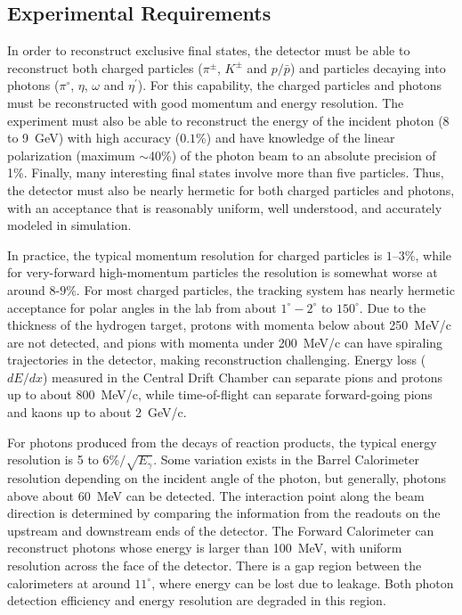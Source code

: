 \subsection[Experimental Requirements]{Experimental Requirements \label{sec:intro:requirements}}
In order to reconstruct exclusive final states, the \gx{} detector must be able to reconstruct both charged particles ($\pi^{\pm}$, $K^{\pm}$ and $p/\bar{p}$) and particles decaying into photons ($\pi^{\circ}$, $\eta$, $\omega$ and $\eta^{\prime}$). For this capability, the charged particles and photons must be reconstructed with good momentum and energy resolution. The experiment must also be able to reconstruct the energy of the incident photon (8 to 9~GeV) with high accuracy ($0.1$\%) and have knowledge of the linear polarization (maximum $\sim$40\%) of the photon beam to an absolute precision of 1\%. Finally, many interesting final states involve more than five particles. Thus, the \gx{} detector must also be nearly hermetic for both charged particles and photons, with an acceptance that is reasonably uniform, well understood, and accurately modeled in simulation.

In practice, the typical momentum resolution for charged particles is $1$--$3\%$, while for very-forward high-momentum particles the resolution is somewhat worse at around $8$-$9\%$. For most charged particles, the tracking system has nearly hermetic acceptance for polar angles in the lab from about $1^\circ-2^{\circ}$ to $150^{\circ}$. Due to the thickness of the hydrogen target, protons with momenta below about 250~MeV/c are not detected, and pions with momenta under 200~MeV/c can have spiraling trajectories in the detector, making reconstruction challenging. Energy loss ($dE/dx$) measured in the Central Drift Chamber can separate pions and protons up to about 800~MeV/c, while time-of-flight can separate forward-going pions and kaons up to about 2~GeV/c.

For photons produced from the decays of reaction products, the typical energy resolution is 5 to 6\%$/\sqrt{E_{\gamma}}$. Some variation exists in the Barrel Calorimeter resolution depending on the incident angle of the photon, but generally, photons above about 60~MeV can be detected. The interaction point along the beam direction is determined by comparing the information from the readouts on the upstream and downstream ends of the detector. The Forward Calorimeter can reconstruct photons whose energy is larger than 100~MeV, with uniform resolution across the face of the detector. There is a gap region between the calorimeters at around $11^{\circ}$, where energy can be lost due to leakage. Both photon detection efficiency and energy resolution are degraded in this region. 
 
